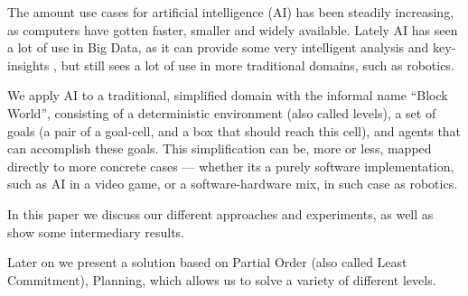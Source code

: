 \documentclass[Main]{subfiles}
\begin{document}
The amount use cases for artificial intelligence (AI) has been steadily increasing, as computers have gotten faster, smaller and widely available.
Lately AI has seen a lot of use in Big Data, as it can provide some very intelligent analysis and key-insights \citep{OLeary2013},
but still sees a lot of use in more traditional domains, such as robotics.

We apply AI to a traditional, simplified domain with the informal name ``Block World'', consisting of a deterministic environment (also called levels), a set of goals (a pair of a goal-cell, and a box that should reach this cell), and agents that can accomplish these goals.
This simplification can be, more or less, mapped directly to more concrete cases --- 
whether its a purely software implementation, such as AI in a video game, or a software-hardware mix, in such case as robotics.

In this paper we discuss our different approaches and experiments, as well as show some intermediary results.

Later on we present a solution based on Partial Order (also called Least Commitment), Planning, 
which allows us to solve a variety of different levels. 
\end{document}
